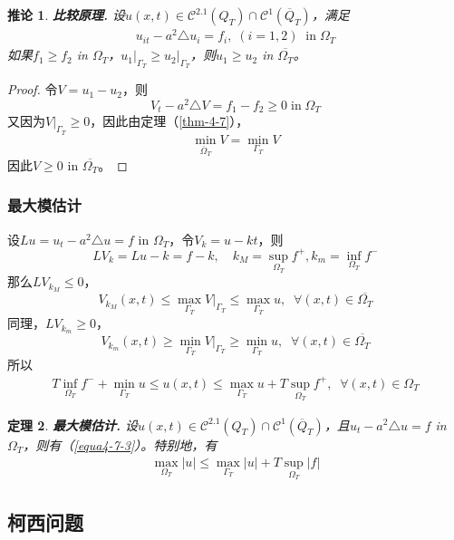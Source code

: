 \documentclass[11pt, a4paper]{article}
\theoremstyle{theorem}
\newtheorem{thm}{定理}[section]
\newtheorem{cor}[thm]{推论}
\begin{document}
\begin{cor} \textbf{比较原理.} 设$u(x,t) \in \mathcal{C}^{2.1} (Q_T) \cap \mathcal{C}^1(\overline{Q}_T)$，满足
\begin{align}
    u_{it} - a^2 \triangle u_i = f_i, \; (i = 1,2) \; \; \text{in} \; \Omega_T
\end{align}
如果$f_1 \geq f_2$ in $\Omega_T$，$u_1 \bigg|_{\Gamma_T} \geq u_2 \bigg|_{\Gamma_T}$，则$u_1 \geq u_2$ in $\overline{\Omega_T}$。
\end{cor}

\begin{proof}
令$V = u_1 - u_2$，则
$$
V_t - a^2 \triangle V = f_1 - f_2 \geq 0 \; \text{in} \; \Omega_T
$$
又因为$V\bigg|_{\Gamma_T} \geq 0$，因此由定理（\ref{thm-4-7}），
$$
\min\limits_{\overline{\Omega}_T} V = \min\limits_{\Gamma_T} V
$$
因此$V \geq 0$ in $\overline{\Omega_T}$。
\end{proof}

\subsubsection{最大模估计}

设$L u = u_t - a^2 \triangle u = f$ in $\Omega_T$，令$V_k = u - kt$，则
$$
L V_k = L u - k = f - k, \quad k_M = \sup\limits_{\Omega_T} f^+, k_m = \inf\limits_{\Omega_T} f^-
$$
那么$L V_{k_M} \leq 0$，
$$
V_{k_M}(x,t) \leq \max\limits_{\Gamma_T} V\bigg|_{\Gamma_T} \leq \max\limits_{\Gamma_T} u, \;\; \forall (x,t) \in \overline{\Omega_T}
$$
同理，$L V_{k_m} \geq 0$，
$$
V_{k_m}(x,t) \geq \min\limits_{\Gamma_T} V\bigg|_{\Gamma_T} \geq \min\limits_{\Gamma_T} u, \;\; \forall (x,t) \in \overline{\Omega_T}
$$
所以
\begin{align}
\label{equa4-7-3}
    T \inf\limits_{\Omega_T} f^- + \min\limits_{\Gamma_T} u \leq u(x,t) \leq \max\limits_{\Gamma_T} u + T \sup\limits_{\Omega_T} f^+, \; \; \forall (x,t) \in \Omega_T
\end{align}

\begin{thm} \textbf{最大模估计.} 设$u(x,t) \in \mathcal{C}^{2.1} (Q_T) \cap \mathcal{C}^1(\overline{Q}_T)$，且$u_t - a^2 \triangle u = f$ in $\Omega_T$，则有（\ref{equa4-7-3}）。特别地，有
\begin{align}
    \max\limits_{\Omega_T} |u| \leq \max\limits_{\Gamma_T} |u| + T \sup\limits_{\Omega_T} |f|
\end{align}
\end{thm}

\subsection{柯西问题}
\end{document}
